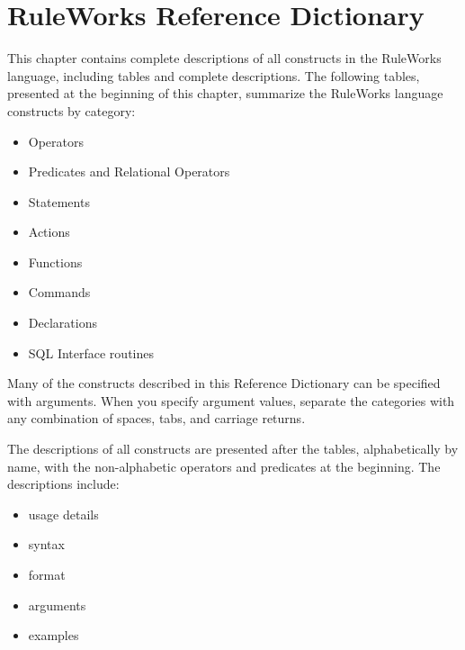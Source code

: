 \chapter{RuleWorks Reference Dictionary}

\makeatletter
\newenvironment{operands}
               {\vspace{1ex}\noindent\textbf{Operands}\nopagebreak
                 \list{}{\labelwidth\z@ \itemindent-\leftmargin
                   \topsep=\z@                   
                   \let\makelabel\operandlabel\let\labelsep=\textwidth}}
               {\endlist}
\newenvironment{arguments}
               {\vspace{1ex}\noindent\textbf{Arguments}\nopagebreak
                 \list{}{\labelwidth\z@ \itemindent-\leftmargin
                   \topsep=\z@                   
                   \let\makelabel\operandlabel\let\labelsep=\textwidth}}
               {\endlist}
\newcommand*\operandlabel[1]{\hspace\labelsep
  \parbox[t]\textwidth{\normalfont\it{#1}\vspace{1.5ex}}}
\makeatother

This chapter contains complete descriptions of all constructs in the
RuleWorks language, including tables and complete descriptions. The
following tables, presented at the beginning of this chapter,
summarize the RuleWorks language constructs by category:

\begin{itemize}
\item Operators
\item Predicates and Relational Operators
\item Statements
\item Actions
\item Functions
\item Commands
\item Declarations
\item SQL Interface routines
\end{itemize}

Many of the constructs described in this Reference Dictionary can be
specified with arguments. When you specify argument values, separate
the categories with any combination of spaces, tabs, and carriage
returns.

The descriptions of all constructs are presented after the tables,
alphabetically by name, with the non-alphabetic operators and
predicates at the beginning. The descriptions include:

\begin{itemize}
\item usage details
\item syntax
\item format
\item arguments
\item examples
\end{itemize}

